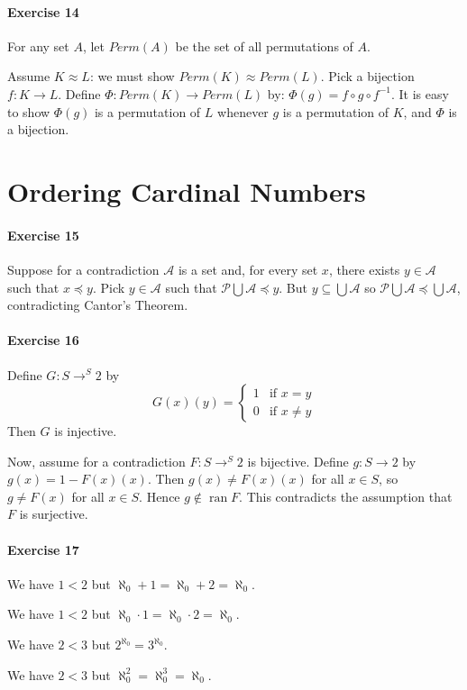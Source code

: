 \documentclass{report}
\newcommand{\ran}{\ensuremath{\operatorname{ran}}}
\newcommand{\inv}[1]{\ensuremath{{#1}^{-1}}}
\begin{document}
    \paragraph{Exercise 14}
    For any set $A$, let $Perm(A)$ be the set of all permutations of $A$.

    Assume $K \approx L$: we must show $Perm(K) \approx Perm(L)$. Pick a bijection $f : K \rightarrow L$.
    Define $\Phi : Perm(K) \rightarrow Perm(L)$ by: $\Phi(g) = f \circ g \circ \inv{f}$. It is easy to
    show $\Phi(g)$ is a permutation of $L$ whenever $g$ is a permutation of $K$, and $\Phi$ is a bijection.

    \section{Ordering Cardinal Numbers}

    \paragraph{Exercise 15}
    Suppose for a contradiction $\mathcal{A}$ is a set and, for every set $x$, there exists $y \in \mathcal{A}$
    such that $x \preccurlyeq y$. Pick $y \in \mathcal{A}$ such that $\mathcal{P} \bigcup \mathcal{A} \preccurlyeq y$.
    But $y \subseteq \bigcup \mathcal{A}$ so $\mathcal{P} \bigcup \mathcal{A} \preccurlyeq \bigcup \mathcal{A}$,
    contradicting Cantor's Theorem.

    \paragraph{Exercise 16}
    Define $G : S \rightarrow ^S 2$ by
    \[ G(x)(y) = \begin{cases}
        1 & \text{if } x = y \\
        0 & \text{if } x \neq y
    \end{cases} \]
    Then $G$ is injective.

    Now, assume for a contradiction $F : S \rightarrow ^S 2$ is bijective. Define $g : S \rightarrow 2$ by
    $g(x) = 1 - F(x)(x)$. Then $g(x) \neq F(x)(x)$ for all $x \in S$, so $g \neq F(x)$ for all $x \in S$.
    Hence $g \notin \ran F$. This contradicts the assumption that $F$ is surjective.

    \paragraph{Exercise 17}
    We have $1 < 2$ but $\aleph_0 + 1 = \aleph_0 + 2 = \aleph_0$.

    We have $1 < 2$ but $\aleph_0 \cdot 1 = \aleph_0 \cdot 2 = \aleph_0$.

    We have $2 < 3$ but $2^{\aleph_0} = 3^{\aleph_0}$.

    We have $2 < 3$ but $\aleph_0^2 = \aleph_0^3 = \aleph_0$.
\end{document}
